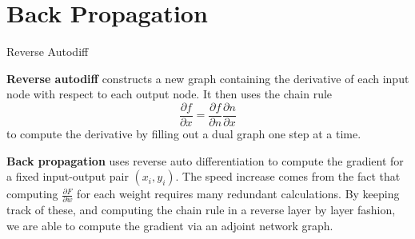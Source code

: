 \documentclass[10pt, table, dvipsnames,xcdraw, handout]{beamer}
\begin{document}
\section{Back Propagation}


\begin{frame}[fragile]{Reverse Autodiff}

\textbf{Reverse autodiff} constructs a new graph containing the derivative of each input node with respect to each output node. It then uses the chain rule
$$
\frac{\partial f}{\partial x} = \frac{\partial f}{\partial n} \frac{\partial n}{\partial x} 
$$
to compute the derivative by filling out a dual graph one step at a time. 

\textbf{Back propagation} uses reverse auto differentiation to compute the gradient for a fixed input-output pair $(x_i,y_i)$. The speed increase comes from the fact that computing $\frac{\partial F}{\partial w}$ for each weight requires many redundant calculations. By keeping track of these, and computing the chain rule in a reverse layer by layer fashion, we are able to compute the gradient via an adjoint network  graph. 
\end{frame}
\end{document}
